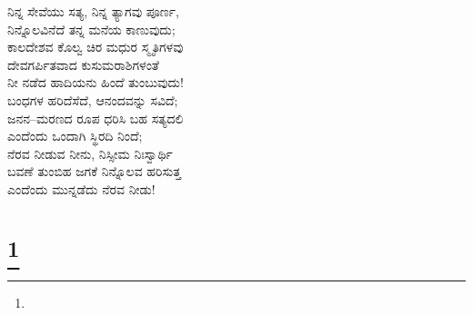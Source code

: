 \begin{myquote}
ನಿನ್ನ ಸೇವೆಯು ಸತ್ಯ, ನಿನ್ನ ತ್ಯಾಗವು ಪೂರ್ಣ,\\ನಿನ್ನೊಲವಿನೆದೆ ತನ್ನ ಮನೆಯ ಕಾಣುವುದು;\\ಕಾಲದೇಶವ ಕೊಲ್ವ ಚಿರ ಮಧುರ ಸ್ಮೃತಿಗಳವು\\ದೇವಗರ್ಪಿತವಾದ ಕುಸುಮರಾಶಿಗಳಂತೆ\\ನೀ ನಡೆದ ಹಾದಿಯನು ಹಿಂದೆ ತುಂಬುವುದು!\\ಬಂಧಗಳ ಹರಿದೆಸೆದೆ, ಆನಂದವನ್ನು ಸವಿದೆ;\\ಜನನ–ಮರಣದ ರೂಪ ಧರಿಸಿ ಬಹ ಸತ್ಯದಲಿ\\ಎಂದೆಂದು ಒಂದಾಗಿ ಸ್ಥಿರದಿ ನಿಂದೆ;\\ನೆರವ ನೀಡುವ ನೀನು, ನಿಸ್ಸೀಮ ನಿಃಸ್ವಾರ್ಥಿ\\ಬವಣೆ ತುಂಬಿಹ ಜಗಕೆ ನಿನ್ನೊಲವ ಹರಿಸುತ್ತ\\ಎಂದೆಂದು ಮುನ್ನಡೆದು ನೆರವ ನೀಡು!
\end{myquote}

\selecteng

\chapter[MY PLAY IS DONE]{\protect\footnote{}}

